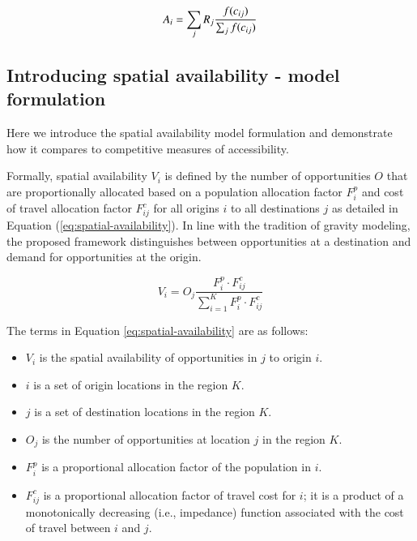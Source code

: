 \documentclass[]{elsarticle} %
\providecommand{\tightlist}{%
  \setlength{\itemsep}{0pt}\setlength{\parskip}{0pt}}
\begin{document}
\begin{equation}
\label{eq:B2SFCA-1}
A_{i} = {\sum_j R_{j}\frac{f(c_{ij})}{\sum_j f(c_{ij})}}\\
\end{equation}

\hypertarget{introducing-spatial-availability---model-formulation}{%
\subsection{Introducing spatial availability - model
formulation}\label{introducing-spatial-availability---model-formulation}}

Here we introduce the spatial availability model formulation and
demonstrate how it compares to competitive measures of accessibility.

Formally, spatial availability \(V_{i}\) is defined by the number of
opportunities \(O\) that are proportionally allocated based on a
population allocation factor \(F^p_{i}\) and cost of travel allocation
factor \(F^c_{ij}\) for all origins \(i\) to all destinations \(j\) as
detailed in Equation (\ref{eq:spatial-availability}). In line with the
tradition of gravity modeling, the proposed framework distinguishes
between opportunities at a destination and demand for opportunities at
the origin.

\begin{equation}
\label{eq:spatial-availability}
V_{i} = O_j\frac{F^p_{i} \cdot F^c_{ij}}{\sum_{i=1}^K F^p_{i} \cdot F^c_{ij}}
\end{equation}

The terms in Equation \ref{eq:spatial-availability} are as follows:

\begin{itemize}
\tightlist
\item
  \(V_{i}\) is the spatial availability of opportunities in \(j\) to
  origin \(i\).
\item
  \(i\) is a set of origin locations in the region \(K\).
\item
  \(j\) is a set of destination locations in the region \(K\).
\item
  \(O_j\) is the number of opportunities at location \(j\) in the region
  \(K\).
\item
  \(F^p_{i}\) is a proportional allocation factor of the population in
  \(i\).
\item
  \(F^c_{ij}\) is a proportional allocation factor of travel cost for
  \(i\); it is a product of a monotonically decreasing (i.e., impedance)
  function associated with the cost of travel between \(i\) and \(j\).
\end{itemize}
\end{document}
